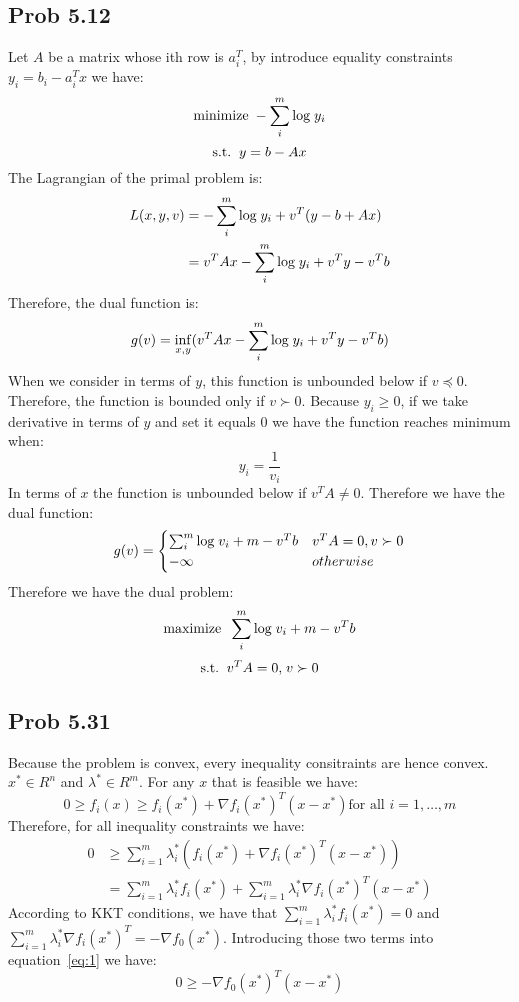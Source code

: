 \documentclass[10pt,a4paper]{article}
\begin{document}
\subsection{Prob 5.12}
Let $A$ be a matrix whose ith row is $a_i^T$, by introduce
equality constraints $y_i=b_i-a_i^Tx$ we have:
$$
\text{minimize\;} -\sum_i^m\text{log\;}y_i
$$
$$
\text{s.t.\;\;} y=b-Ax
$$
The Lagrangian of the primal problem is:
\begin{align*}
  L(x,y,v) &= -\sum_i^m\text{log\;}y_i + v^T(y-b+Ax)\\
         &= v^TAx -\sum_i^m\text{log\;}y_i + v^Ty-v^Tb
\end{align*}
Therefore, the dual function is:
$$
g(v)=\inf_{x,y} (v^TAx -\sum_i^m\text{log\;}y_i + v^Ty-v^Tb)
$$
When we consider in terms of $y$, this function is unbounded
below if $v\preceq0$. Therefore, the function is bounded
only if $v\succ0$. Because $y_i\geq0$, if we take derivative
in terms of $y$ and set it equals $0$ we have the function
reaches minimum when:
$$
y_i=\frac{1}{v_i}
$$
In terms of $x$ the function is unbounded below if
$v^TA\neq0$. Therefore we have the dual function:
\begin{align*}
g(v)=
\begin{cases}
  \sum_i^m\text{log\;}v_i + m-v^Tb & v^TA=0, v\succ0\\
  -\infty &otherwise
\end{cases}
\end{align*}
Therefore we have the dual problem:
$$
\text{maximize\;\;}\sum_i^m\text{log\;}v_i + m-v^Tb 
$$
$$
\text{s.t.\;\;} v^TA=0\text{,\;} v\succ0
$$


\subsection{Prob 5.31}
Because the problem is convex, every inequality consitraints
are hence convex. $x^*\in R^n$ and $\lambda^*\in R^m$. For any $x$ that is feasible we have:
$$
0\geq f_i(x) \geq f_i(x^*) +\nabla f_i(x^*)^T(x-x^*)\text{
  for all } i=1,\dots,m
$$
Therefore, for all inequality constraints we have:
\begin{align}
  0 &\geq \sum_{i=1}^m\lambda_i^*(f_i(x^*)+\nabla f_i(x^*)^T(x-x^*))\\
\label{eq:1}
&= \sum_{i=1}^m\lambda_i^*f_i(x^*)+\sum_{i=1}^m\lambda_i^*\nabla f_i(x^*)^T(x-x^*)
\end{align}
According to KKT conditions, we have that
$\sum_{i=1}^m\lambda_i^*f_i(x^*)=0$ and
$\sum_{i=1}^m\lambda_i^*\nabla f_i(x^*)^T=-\nabla f_0(x^*)$.
Introducing those two terms into equation~\ref{eq:1} we have:
$$
0\geq-\nabla f_0(x^*)^T(x-x^*)
$$


	\renewcommand\refname{Bibliography}
	
	
\end{document}
